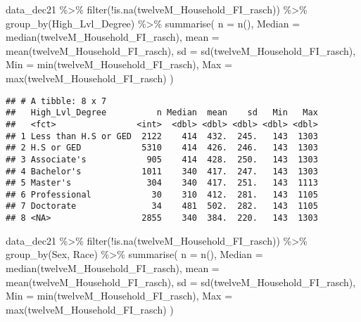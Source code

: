 \documentclass[
]{article}
\newenvironment{Shaded}{\begin{snugshade}}{\end{snugshade}}
\newcommand{\AttributeTok}[1]{\textcolor[rgb]{0.77,0.63,0.00}{#1}}
\newcommand{\FunctionTok}[1]{\textcolor[rgb]{0.00,0.00,0.00}{#1}}
\newcommand{\NormalTok}[1]{#1}
\newcommand{\SpecialCharTok}[1]{\textcolor[rgb]{0.00,0.00,0.00}{#1}}
\begin{document}
\begin{Shaded}
\begin{Highlighting}[]
\NormalTok{data\_dec21 }\SpecialCharTok{\%\textgreater{}\%} \FunctionTok{filter}\NormalTok{(}\SpecialCharTok{!}\FunctionTok{is.na}\NormalTok{(twelveM\_Household\_FI\_rasch)) }\SpecialCharTok{\%\textgreater{}\%} 
\FunctionTok{group\_by}\NormalTok{(High\_Lvl\_Degree) }\SpecialCharTok{\%\textgreater{}\%}
  \FunctionTok{summarise}\NormalTok{(}
    \AttributeTok{n =} \FunctionTok{n}\NormalTok{(),}
    \AttributeTok{Median =} \FunctionTok{median}\NormalTok{(twelveM\_Household\_FI\_rasch),}
    \AttributeTok{mean =} \FunctionTok{mean}\NormalTok{(twelveM\_Household\_FI\_rasch),}
    \AttributeTok{sd =} \FunctionTok{sd}\NormalTok{(twelveM\_Household\_FI\_rasch),}
    \AttributeTok{Min =} \FunctionTok{min}\NormalTok{(twelveM\_Household\_FI\_rasch),}
    \AttributeTok{Max =} \FunctionTok{max}\NormalTok{(twelveM\_Household\_FI\_rasch)}
\NormalTok{  )}
\end{Highlighting}
\end{Shaded}

\begin{verbatim}
## # A tibble: 8 x 7
##   High_Lvl_Degree          n Median  mean    sd   Min   Max
##   <fct>                <int>  <dbl> <dbl> <dbl> <dbl> <dbl>
## 1 Less than H.S or GED  2122    414  432.  245.   143  1303
## 2 H.S or GED            5310    414  426.  246.   143  1303
## 3 Associate's            905    414  428.  250.   143  1303
## 4 Bachelor's            1011    340  417.  247.   143  1303
## 5 Master's               304    340  417.  251.   143  1113
## 6 Professional            30    310  412.  281.   143  1105
## 7 Doctorate               34    481  502.  282.   143  1105
## 8 <NA>                  2855    340  384.  220.   143  1303
\end{verbatim}

\begin{Shaded}
\begin{Highlighting}[]
\NormalTok{data\_dec21 }\SpecialCharTok{\%\textgreater{}\%} \FunctionTok{filter}\NormalTok{(}\SpecialCharTok{!}\FunctionTok{is.na}\NormalTok{(twelveM\_Household\_FI\_rasch)) }\SpecialCharTok{\%\textgreater{}\%} 
\FunctionTok{group\_by}\NormalTok{(Sex, Race) }\SpecialCharTok{\%\textgreater{}\%}
  \FunctionTok{summarise}\NormalTok{(}
    \AttributeTok{n =} \FunctionTok{n}\NormalTok{(),}
    \AttributeTok{Median =} \FunctionTok{median}\NormalTok{(twelveM\_Household\_FI\_rasch),}
    \AttributeTok{mean =} \FunctionTok{mean}\NormalTok{(twelveM\_Household\_FI\_rasch),}
    \AttributeTok{sd =} \FunctionTok{sd}\NormalTok{(twelveM\_Household\_FI\_rasch),}
    \AttributeTok{Min =} \FunctionTok{min}\NormalTok{(twelveM\_Household\_FI\_rasch),}
    \AttributeTok{Max =} \FunctionTok{max}\NormalTok{(twelveM\_Household\_FI\_rasch)}
\NormalTok{  )}
\end{Highlighting}
\end{Shaded}
\end{document}
